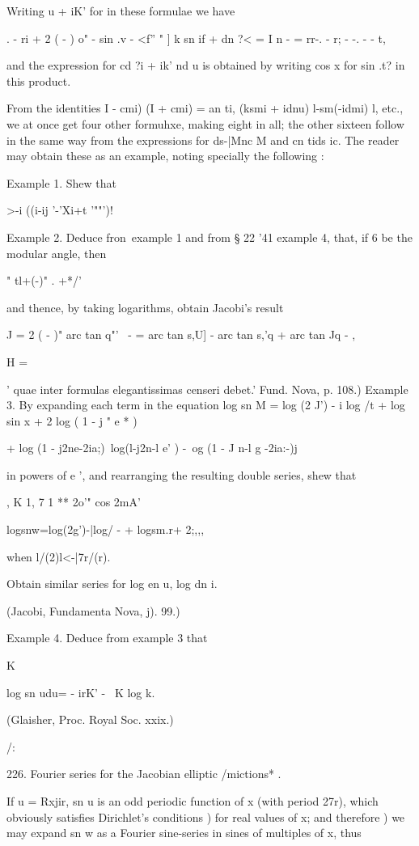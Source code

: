 Writing u + iK' for in these formulae we have

. - ri + 2  ( - ) o" - sin .v - <f'' " ] k sn if + dn ?< = I n - =
rr-. - r; - -. - - t,

and the expression for cd ?i + ik' nd u is obtained by writing cos x
for sin .t? in this product.

From the identities I - cmi) (I + cmi) = an ti, (ksmi + idnu)
l-sm(-idmi) l, etc., we at once get four other formuhxe, making eight
in all; the other sixteen follow in the same way from the expressions
for ds-|Mnc M and cn tids ic. The reader may obtain these as an
example, noting specially the following :

Example 1. Shew that

  >-i ((i-ij '-'Xi+t '""')!

Example 2. Deduce fron\ example 1 and from § 22 '41 example 4, that,
if 6 be the modular angle, then

" tl+(-)" . +*/'

and thence, by taking logarithms, obtain Jacobi's result

J = 2 ( - )" arc tan q"'~ - = arc tan s,U] - arc tan s,'q + arc tan Jq
-  ,

H =

' quae inter formulas elegantissimas censeri debet.' Fund. Nova, p.
108.) Example 3. By expanding each term in the equation log sn M = log
(2 J') - i log /t + log sin x + 2 log ( 1 - j " e * )

+ log (1 - j2ne-2ia;)\ log(l-j2n-l e' ) -\ og (1 - J n-l g -2ia:-)j

in powers of e ', and rearranging the resulting double series, shew
that

, K 1, 7 1  ** 2o'" cos 2mA'

logsnw=log(2g')-|log/ - + logsm.r+ 2;,,,

when l/(2)l<-|7r/(r).

Obtain similar series for log en u, log dn i.

(Jacobi, Fundamenta Nova, j). 99.)

Example 4. Deduce from example 3 that

 K

log sn udu= - irK' - \ K log k.

(Glaisher, Proc. Royal Soc. xxix.)

/:

%
%

226. Fourier series for the Jacobian elliptic /mictions* .

If u = Rxjir, sn u is an odd periodic function of x (with period 27r),
which obviously satisfies Dirichlet's conditions ) for real
values of x; and therefore ) we may expand sn w as a Fourier
sine-series in sines of multiples of x, thus

